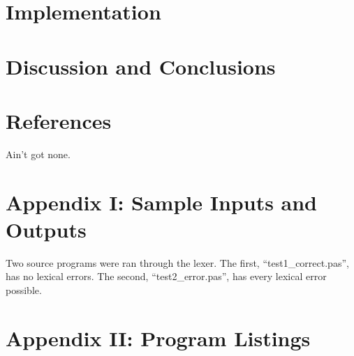 \documentclass[paper=letter, fontsize=11pt, oneside, titlepage]{scrartcl}
\newcommand{\datalisting}[2][]{
    
}
\newcommand{\filelisting}[2][]{
    
}
\begin{document}
\section{Implementation}\label{impl}



\section{Discussion and Conclusions}\label{conclusions}



\section{References}\label{ref}

Ain't got none.

\section{Appendix I: Sample Inputs and Outputs}\label{sample}

Two source programs were ran through the lexer. The first, ``test1\_correct.pas'', has no lexical errors.  The second, ``test2\_error.pas'', has every lexical error possible.

\filelisting[language=pascal]{test1_correct.pas}
\filelisting{test1_correct.pas.listing}
\filelisting{test1_correct.pas.tokens}
\filelisting[language=pascal]{test2_errors.pas}
\filelisting{test2_errors.pas.listing}
\filelisting{test2_errors.pas.tokens}

\section{Appendix II: Program Listings}\label{code}

\datalisting{operators.dat}
\datalisting{punctuation.dat}
\datalisting{reservedwords.dat}
\end{document}
